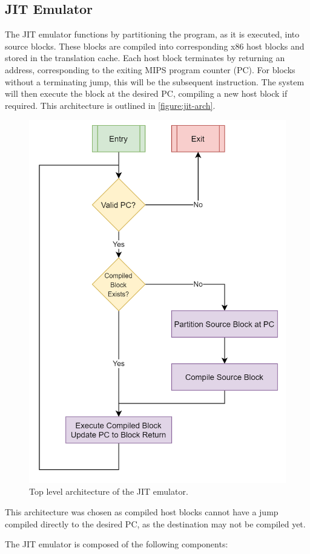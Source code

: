 \subsection{JIT Emulator}
\label{section:jit-arch}

The JIT emulator functions by partitioning the program, as it is executed, into source blocks. These blocks are compiled into corresponding x86 host blocks and stored in the translation cache. Each host block terminates by returning an address, corresponding to the exiting MIPS program counter (PC). For blocks without a terminating jump, this will be the subsequent instruction. The system will then execute the block at the desired PC, compiling a new host block if required. This architecture is outlined in \autoref{figure:jit-arch}.

\begin{figure}[H]
    \centering
    \includegraphics[width=0.5\linewidth]{diagrams/jit.png}
    \caption{Top level architecture of the JIT emulator.}
    \label{figure:jit-arch}
\end{figure}

This architecture was chosen as compiled host blocks cannot have a jump compiled directly to the desired PC, as the destination may not be compiled yet.

The JIT emulator is composed of the following components:

